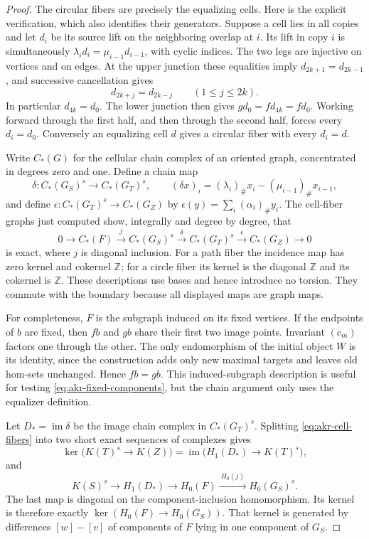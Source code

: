 \begin{proof}
The circular fibers are precisely the equalizing cells. Here is the
explicit verification, which also identifies their generators.
Suppose a cell lies in all copies and let $d_i$ be its source lift on
the neighboring overlap at $i$. Its lift in copy $i$ is simultaneously
$\lambda_i d_i=\mu_{i-1}d_{i-1}$, with cyclic indices. The two legs
are injective on vertices and on edges. At the upper junction these
equalities imply $d_{2k+1}=d_{2k-1}$, and successive cancellation
gives
\[
 d_{2k+j}=d_{2k-j}\qquad(1\leq j\leq2k).
\]
In particular $d_{4k}=d_0$. The lower junction then gives
$gd_0=fd_{4k}=fd_0$. Working forward through the first half, and then
through the second half, forces every $d_i=d_0$. Conversely an
equalizing cell $d$ gives a circular fiber with every $d_i=d$.

Write $C_*(G)$ for the cellular chain complex of an oriented graph,
concentrated in degrees zero and one. Define a chain map
\[
 \delta:C_*(G_S)^s\longrightarrow C_*(G_T)^s,
 \qquad
 (\delta x)_i=(\lambda_i)_\#x_i-(\mu_{i-1})_\#x_{i-1},
\]
and define
$\epsilon:C_*(G_T)^s\to C_*(G_Z)$ by
$\epsilon(y)=\sum_i(\alpha_i)_\#y_i$.
The cell-fiber graphs just computed show, integrally and degree by
degree, that
\[
 0\longrightarrow C_*(F)
 \xrightarrow{\ j\ } C_*(G_S)^s
 \xrightarrow{\ \delta\ } C_*(G_T)^s
 \xrightarrow{\ \epsilon\ } C_*(G_Z)
 \longrightarrow0
 \tag{CF}\label{eq:akr-cell-fibers}
\]
is exact, where $j$ is diagonal inclusion. For a path fiber the
incidence map has zero kernel and cokernel $\mathbb Z$; for a circle
fiber its kernel is the diagonal $\mathbb Z$ and its cokernel is
$\mathbb Z$. These descriptions use bases and hence introduce no
torsion. They commute with the boundary because all displayed maps
are graph maps.

For completeness, $F$ is the subgraph induced on its fixed vertices.
If the endpoints of $b$ are fixed, then $fb$ and $gb$ share their
first two image points. Invariant $(c_m)$ factors one through the
other. The only endomorphism of the initial object $W$ is its
identity, since the construction adds only new maximal targets and
leaves old hom-sets unchanged. Hence $fb=gb$. This induced-subgraph
description is useful for testing \eqref{eq:akr-fixed-components}, but
the chain argument only uses the equalizer definition.

Let $D_* =\operatorname{im}\delta$ be the image chain complex in
$C_*(G_T)^s$. Splitting \eqref{eq:akr-cell-fibers} into two short exact
sequences of complexes gives
\[
 \ker\bigl(K(T)^s\longrightarrow K(Z)\bigr)
     =\operatorname{im}\bigl(H_1(D_*)\longrightarrow K(T)^s\bigr),
\]
and
\[
 K(S)^s\longrightarrow H_1(D_*)\longrightarrow H_0(F)
       \xrightarrow{\ H_0(j)\ }H_0(G_S)^s.
 \tag{HC}\label{eq:akr-fiber-homology}
\]
The last map is diagonal on the component-inclusion homomorphism.
Its kernel is therefore exactly
$\ker(H_0(F)\to H_0(G_S))$. That kernel is generated by differences
$[w]-[v]$ of components of $F$ lying in one component of $G_S$.


\end{proof}
